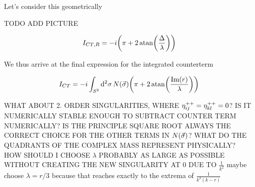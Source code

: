 Let's consider this geometrically

TODO ADD PICTURE

\begin{equation}
    I_{CT, R} =  -i\qty(\pi + 2\atan(\frac{\Delta}{\lambda}))
\end{equation}

We thus arrive at the final expression for the integrated counterterm

\begin{equation}
    I_{CT} = -i\int_{S^2} \dd[2]{\sigma} N(\va{\sigma}) \qty(\pi + 2\atan(\frac{\Im(r)}{\lambda}))
\end{equation}

WHAT ABOUT 2. ORDER SINGULARITIES, WHERE $\eta_{ij}^{++} = \eta_{kl}^{++} = 0$?
IS IT NUMERICALLY STABLE ENOUGH TO SUBTRACT COUNTER TERM NUMERICALLY?
IS THE PRINCIPLE SQUARE ROOT ALWAYS THE CORRECT CHOICE FOR THE OTHER TERMS IN $N(\va{\sigma})$?
WHAT DO THE QUADRANTS OF THE COMPLEX MASS REPRESENT PHYSICALLY?
HOW SHOULD I CHOOSE $\lambda$ PROBABLY AS LARGE AS POSSIBLE WITHOUT CREATING THE NEW SINGULARITY AT 0 DUE TO $\frac{1}{k^2}$
maybe choose $\lambda = r/3$ because that reaches exactly to the extrema of $\frac{1}{k^2(k-r)}$